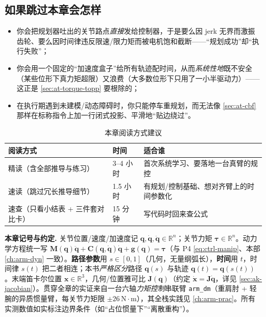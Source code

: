 \subsection*{如果跳过本章会怎样}
\begin{itemize}
  \item 你会把规划器吐出的关节路点\emph{直接}发给控制器，于是要么因 jerk 无界而激振齿轮、要么因时间律违反限速/限力矩而被电机饱和截断——“规划成功”却“执行失败”；
  \item 你会用一个固定的“加速度盒子”给所有轨迹配时间，从而\emph{系统性地}既不安全（某些位形下真力矩超限）又浪费（大多数位形下只用了一小半驱动力）——这正是 \cref{sec:at-torque-topp} 要根除的；
  \item 在执行期遇到未建模/动态障碍时，你只能停车重规划，而无法像 \cref{sec:at-cbf} 那样在标称指令上加一行闭式投影、平滑地“贴边绕过”。
\end{itemize}

\begin{table}[H]\centering\small
\caption{本章阅读方式建议}
\begin{tabular}{lll}
\toprule
阅读方式 & 时间 & 适合谁 \\
\midrule
精读（含全部推导与练习） & 3--4 小时 & 首次系统学习、要落地一台真臂的规控 \\
速读（跳过冗长推导细节） & 1.5 小时 & 有规划/控制基础、想对齐臂上的时间参数化 \\
速查（只看小结表 + 三件套对比卡） & 15 分钟 & 写代码时回来查公式 \\
\bottomrule
\end{tabular}
\end{table}

\begin{note}
\textbf{本章记号与约定.}\;
关节位置/速度/加速度记 $\mathbf{q},\dot{\mathbf{q}},\ddot{\mathbf{q}}\in\mathbb{R}^n$；关节力矩 $\boldsymbol{\tau}\in\mathbb{R}^n$。动力学方程统一写 $\mathbf{M}(\mathbf{q})\ddot{\mathbf{q}}+\mathbf{C}(\mathbf{q},\dot{\mathbf{q}})\dot{\mathbf{q}}+\mathbf{g}(\mathbf{q})=\boldsymbol{\tau}$（与 P4 \cref{eq:ctrl-manip}、本部 \cref{ch:arm-dyn} 一致）。\textbf{路径参数}用 $s\in[0,1]$（几何，无量纲弧长），\textbf{时间}用 $t$，时间律 $s(t)$ 把二者相连；本书\emph{严格区分}路径 $\mathbf{q}(s)$ 与轨迹 $\mathbf{q}(t)=\mathbf{q}(s(t))$。末端笛卡尔位置 $\mathbf{x}\in\mathbb{R}^3$，几何/位置雅可比 $\mathbf{J}(\mathbf{q})$（约定 $\dot{\mathbf{x}}=\mathbf{J}\dot{\mathbf{q}}$，详见 \cref{sec:ak-jacobian}）。贯穿全章的实证来自一台六轴\emph{力矩控制}串联臂 \texttt{arm\_dm}（重肩肘 + 轻腕的异质惯量臂，每关节力矩限 $\pm 26\,\mathrm{N\!\cdot\! m}$），其全栈实践见 \cref{ch:arm-prac}。所有实测数值如实标注边界条件（如“占位惯量下”“离散重构”）。
\end{note}

